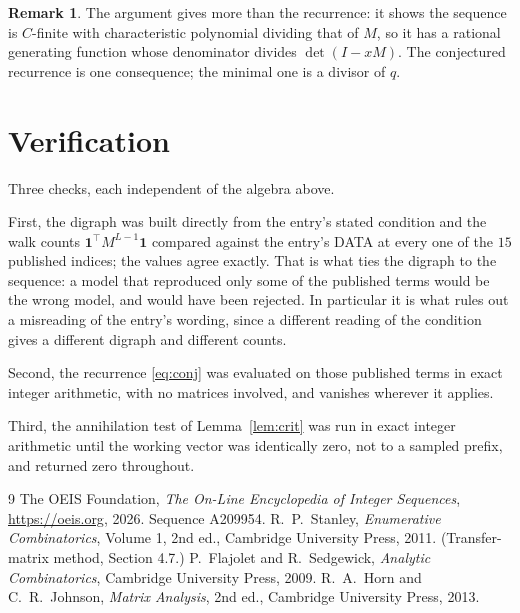 \documentclass[11pt,a4paper]{article}
\theoremstyle{plain}
\theoremstyle{definition}
\newtheorem{remark}[theorem]{Remark}
\begin{document}
\begin{remark}
The argument gives more than the recurrence: it shows the sequence is $C$-finite with
characteristic polynomial dividing that of $M$, so it has a rational generating function
whose denominator divides $\det(I-xM)$. The conjectured recurrence is one consequence; the
minimal one is a divisor of $q$.
\end{remark}

\section{Verification}

Three checks, each independent of the algebra above.

First, the digraph was built directly from the entry's stated condition and the walk counts
$\mathbf{1}^{\!\top}M^{L-1}\mathbf{1}$ compared against the entry's DATA at
every one of the $15$ published indices; the values agree exactly. That is what ties
the digraph to the sequence: a model that reproduced only some of the published terms would
be the wrong model, and would have been rejected. In particular it is what rules out a
misreading of the entry's wording, since a different reading of the condition gives a
different digraph and different counts.

Second, the recurrence \eqref{eq:conj} was evaluated on those published terms in exact
integer arithmetic, with no matrices involved, and vanishes wherever it applies.

Third, the annihilation test of Lemma~\ref{lem:crit} was run in exact integer arithmetic
until the working vector was identically zero, not to a sampled prefix, and returned zero
throughout.

\begin{thebibliography}{9}
 The OEIS Foundation, \emph{The On-Line Encyclopedia of Integer
Sequences}, \url{https://oeis.org}, 2026. Sequence A209954.
 R.~P.~Stanley, \emph{Enumerative Combinatorics}, Volume 1, 2nd ed.,
Cambridge University Press, 2011. (Transfer-matrix method, Section 4.7.)
 P.~Flajolet and R.~Sedgewick, \emph{Analytic Combinatorics}, Cambridge
University Press, 2009.
 R.~A.~Horn and C.~R.~Johnson, \emph{Matrix Analysis}, 2nd ed., Cambridge
University Press, 2013.
\end{thebibliography}
\end{document}
